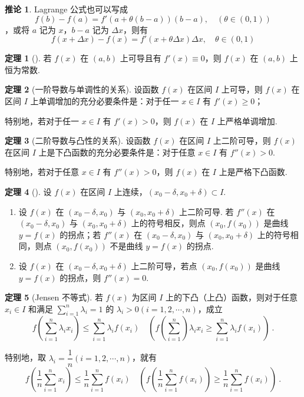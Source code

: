 \documentclass[zihao=-4,linespread=1.8,UTF8,nothm]{aytony_base}
\theoremstyle{definition}
\newtheorem{theorem}{\indent\heiti\textbf{定理}}[subsection]
\newtheorem*{corollary}{\indent\heiti\textbf{推论}}
\begin{document}
\begin{corollary}
    Lagrange 公式也可以写成 $$
        f(b) - f(a) = f'(a+  \theta(b-a))(b-a),\quad (\theta \in (0, 1))
    $$，或将 $a$ 记为 $x$，$b-a$ 记为 $\Delta x$，则有 $$
        f(x + \Delta x) - f(x) = f'(x + \theta \Delta x)\Delta x,\quad \theta \in (0, 1)
    $$
\end{corollary}

\begin{theorem}[]
    若 $f(x)$ 在 $(a, b)$ 上可导且有 $f'(x)\equiv 0$，则 $f(x)$ 在 $(a, b)$ 上恒为常数.
\end{theorem}

\begin{theorem}[一阶导数与单调性的关系]
    设函数 $f(x)$ 在区间 $I$ 上可导，则 $f(x)$ 在区间 $I$ 上单调增加的充分必要条件是：对于任一 $x \in I$ 有 $f'(x) \geqslant 0$；

    特别地，若对于任一 $x \in I$ 有 $f'(x) > 0$，则 $f(x)$ 在 $I$ 上严格单调增加.
\end{theorem}

\begin{theorem}[二阶导数与凸性的关系]
    设函数 $f(x)$ 在区间 $I$ 上二阶可导，则 $f(x)$ 在区间 $I$ 上是下凸函数的充分必要条件是：对于任意 $x \in I$ 有 $f''(x) > 0$.

    特别地，若对于任意 $x \in I$ 有 $f''(x) > 0$，则 $f(x)$ 在 $I$ 上是严格下凸函数.
\end{theorem}

\begin{theorem}[]
    设 $f(x)$ 在区间 $I$ 上连续，$(x_0 - \delta, x_0 + \delta) \subset I$.
    \begin{enumerate}
        \item 设 $f(x)$ 在 $(x_0 - \delta, x_0)$ 与 $(x_0, x_0 + \delta)$ 上二阶可导. 若 $f''(x)$ 在 $(x_0 - \delta, x_0)$ 与 $(x_0, x_0 + \delta)$ 上的符号相反，则点 $(x_0, f(x_0))$ 是曲线 $y = f(x)$ 的拐点；若 $f''(x)$ 在 $(x_0 - \delta, x_0)$ 与 $(x_0, x_0 + \delta)$ 上的符号相同，则点 $(x_0, f(x_0))$ 不是曲线 $y = f(x)$ 的拐点.
        \item 设 $f(x)$ 在 $(x_0 - \delta, x_0 + \delta) $ 上二阶可导，若点 $(x_0, f(x_0))$ 是曲线 $y = f(x)$ 的拐点，则 $f''(x) = 0$.
    \end{enumerate}
\end{theorem}

\begin{theorem}[Jensen 不等式]
    若 $f(x)$ 为区间 $I$ 上的下凸（上凸）函数，则对于任意 $x_i \in I$ 和满足 $\sum\limits_{i = 1}^n\lambda_i = 1$ 的 $\lambda_i > 0(i = 1, 2, \cdots, n)$，成立 $$
        f \left(\sum\limits_{i = 1}^n \lambda_ix_i\right) \leqslant \sum\limits_{i = 1}^{n}\lambda_if(x_i)\quad \left(f(\sum\limits_{i = 1}^{n})\lambda_ix_i\geqslant \sum\limits_{i = 1}^{n}\lambda_if(x_i)\right) \ .
    $$

    特别地，取 $\lambda_i = \dfrac{1}{n}(i = 1, 2, \cdots, n)$，就有 $$
        f \left(\dfrac{1}{n}\sum\limits_{i = 1}^{n}x_i\right) \leqslant \dfrac{1}{n}\sum\limits_{i=1}^{n}f(x_i)\quad \left(f \left(\dfrac{1}{n}\sum\limits_{i = 1}^{n}f(x_i)\right) \geqslant \dfrac{1}{n}\sum\limits_{i=1}^{n}f(x_i)\right)\ .
    $$
\end{theorem}
\end{document}
